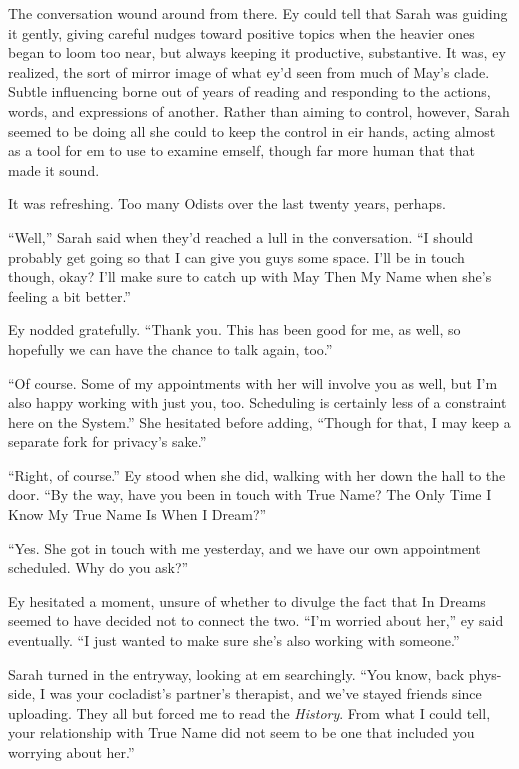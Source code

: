 The conversation wound around from there. Ey could tell that Sarah was guiding it gently, giving careful nudges toward positive topics when the heavier ones began to loom too near, but always keeping it productive, substantive. It was, ey realized, the sort of mirror image of what ey'd seen from much of May's clade. Subtle influencing borne out of years of reading and responding to the actions, words, and expressions of another. Rather than aiming to control, however, Sarah seemed to be doing all she could to keep the control in eir hands, acting almost as a tool for em to use to examine emself, though far more human that that made it sound.

It was refreshing. Too many Odists over the last twenty years, perhaps.

``Well,'' Sarah said when they'd reached a lull in the conversation. ``I should probably get going so that I can give you guys some space. I'll be in touch though, okay? I'll make sure to catch up with May Then My Name when she's feeling a bit better.''

Ey nodded gratefully. ``Thank you. This has been good for me, as well, so hopefully we can have the chance to talk again, too.''

``Of course. Some of my appointments with her will involve you as well, but I'm also happy working with just you, too. Scheduling is certainly less of a constraint here on the System.'' She hesitated before adding, ``Though for that, I may keep a separate fork for privacy's sake.''

``Right, of course.'' Ey stood when she did, walking with her down the hall to the door. ``By the way, have you been in touch with True Name? The Only Time I Know My True Name Is When I Dream?''

``Yes. She got in touch with me yesterday, and we have our own appointment scheduled. Why do you ask?''

Ey hesitated a moment, unsure of whether to divulge the fact that In Dreams seemed to have decided not to connect the two. ``I'm worried about her,'' ey said eventually. ``I just wanted to make sure she's also working with someone.''

Sarah turned in the entryway, looking at em searchingly. ``You know, back phys-side, I was your cocladist's partner's therapist, and we've stayed friends since uploading. They all but forced me to read the \emph{History}. From what I could tell, your relationship with True Name did not seem to be one that included you worrying about her.''

